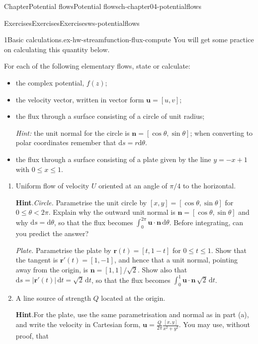 \documentclass[oneside,10pt,]{book}
\newcommand{\blocktitlefont}{\relax}
\newcommand{\ptxlistdisc}{\raisebox{0.3ex}{\textbullet}}
\numberwithin{equation}{section}
\newcommand{\de}{\mathrm{d}}
\newcommand{\bn}{\boldsymbol{n}}
\newcommand{\bu}{\boldsymbol{u}}
\newcommand{\br}{\boldsymbol{r}}
\newcommand{\lt}{<}
\begin{document}
\begin{chapterptx}{Chapter}{Potential flows}{}{Potential flows}{}{}{ch-chapter04-potentialflows}
\begin{exercises-section}{Exercises}{Exercises}{}{Exercises}{}{}{ws-potentialflows}
\begin{exercisegroup}
\begin{divisionexerciseeg}{1}{Basic calculations.}{}{ex-hw-streamfunction-flux-compute}
You will get some practice on calculating this quantity below.%
 \par
For each of the following elementary flows, state or calculate:%
\begin{itemize}[label=\ptxlistdisc]
\item{}the complex potential, \(f(z)\);%
\item{}the velocity vector, written in vector form \(\bu = [u, v]\);%
\item{}the flux through a surface consisting of a circle of unit radius;%
\par
\emph{Hint:} the unit normal for the circle is \(\bn = [\cos\theta, \sin\theta]\); when converting to polar coordinates remember that \(\de{s} = r\de{\theta}\).%
\item{}the flux through a surface consisting of a plate given by the line \(y = -x + 1\) with \(0 \leq x \leq 1\).%
\end{itemize}
%
\begin{enumerate}[font=\bfseries,label=(\alph*),ref=\alph*]%
\item{}Uniform flow of velocity \(U\) oriented at an angle of \(\pi/4\) to the horizontal.%
\par\smallskip%
\noindent\textbf{\blocktitlefont Hint}.\hypertarget{ex-hw-streamfunction-flux-compute-3-2}{}\quad{}\emph{Circle.} Parametrise the unit circle by \([x, y] = [\cos\theta, \sin\theta]\) for \(0 \leq \theta \lt 2\pi\). Explain why the outward unit normal is \(\bn = [\cos\theta, \sin\theta]\) and why \(\de{s} = \de\theta\), so that the flux becomes \(\int_0^{2\pi} \bu \cdot \bn \, \de\theta\). Before integrating, can you predict the answer?%
\par
\emph{Plate.} Parametrise the plate by \(\br(t) = [t, 1 - t]\) for \(0 \leq t \leq 1\). Show that the tangent is \(\br'(t) = [1, -1]\), and hence that a unit normal, pointing away from the origin, is \(\bn = [1, 1]/\sqrt{2}\). Show also that \(\de{s} = |\br'(t)| \, \de{t} = \sqrt{2} \, \de{t}\), so that the flux becomes \(\int_0^1 \bu \cdot \bn \, \sqrt{2} \, \de{t}\).%
\item{}A line source of strength \(Q\) located at the origin.%
\par\smallskip%
\noindent\textbf{\blocktitlefont Hint}.\hypertarget{ex-hw-streamfunction-flux-compute-4-2}{}\quad{}For the plate, use the same parametrisation and normal as in part (a), and write the velocity in Cartesian form, \(\bu = \frac{Q}{2\pi}\frac{[x, y]}{x^2 + y^2}\). You may use, without proof, that%
\begin{equation*}

\end{equation*}
\end{enumerate}
\end{divisionexerciseeg}
\end{exercisegroup}
\end{exercises-section}
\end{chapterptx}
\end{document}
